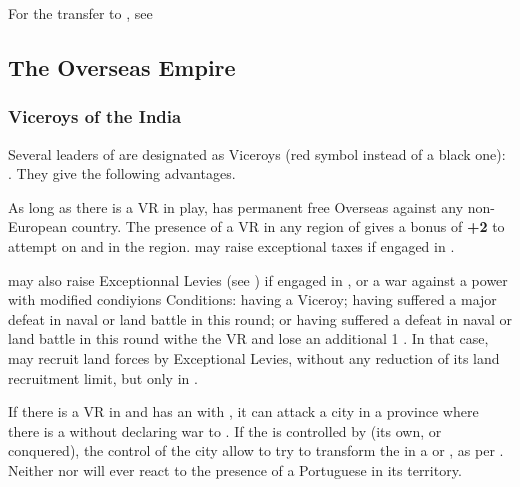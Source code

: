 \aparag For the transfer to , see

\subsection{The Overseas Empire}
\subsubsection{Viceroys of the India}\label{chSpecific:Portugal:Viceroys}
\aparag Several leaders of \POR are designated as Viceroys (red symbol
instead of a black one): .
They give \POR the following advantages.

\bparag As long as there is a VR in play, \POR has permanent free
Overseas \CB against any non-European country.
\bparag The presence of a VR in any region of \ROTW gives a bonus of
{\bf +2} to \CONC attempt on \TP and \COL in the region.
\aparag \POR may raise exceptional taxes if engaged in .

\aparag \POR may also raise Exceptionnal Levies (see
) if engaged in ,
or a war against a \ROTW power with modified condiyions
\bparag Conditions: having a Viceroy; having suffered a major defeat in
naval or land battle in \ROTW this round; or having suffered a defeat in
naval or land battle in \ROTW this round withe the VR and lose an
additional 1 \STAB.
\bparag In that case, \POR may recruit land forces by Exceptional
Levies, without any reduction of its land recruitment limit, but only in
\ROTW.

\label{chSpecific:Portugal:Goa Colony}
\bparag If there is a VR in  and \POR has an \dipAT
with , it can attack a city in a province where there
is a \TP without declaring war to .
\bparag If the \TP is controlled by \POR (its own, or conquered), the
control of the city allow \POR to try to transform the \TP in a \COL or
\POR, as per .
\bparag Neither  nor  will ever react to
the presence of a Portuguese \COL in its territory.

